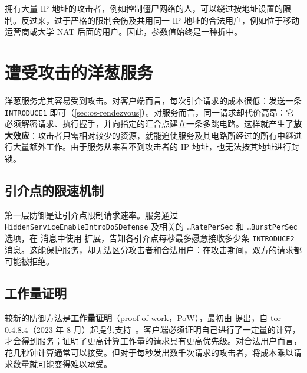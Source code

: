 \begin{attenzione}[按地址限制的局限]
拥有大量 IP 地址的攻击者，例如控制僵尸网络的人，可以绕过按地址设置的限制。反过来，过于严格的限制会伤及共用同一 IP 地址的合法用户，例如位于移动运营商或大学 NAT 后面的用户。因此，参数值始终是一种折中。
\end{attenzione}

\section{遭受攻击的洋葱服务}\label{sec:dos-onion}

洋葱服务尤其容易受到攻击。对客户端而言，每次引介请求的成本很低：发送一条 \texttt{INTRODUCE1} 即可（\cref{sec:os-rendezvous}）。对服务而言，同一请求却代价高昂：它必须解密请求、执行握手，并向指定的汇合点建立一条多跳电路。这样就产生了\textbf{放大效应}：攻击者只需相对较少的资源，就能迫使服务及其电路所经过的所有中继进行大量额外工作。由于服务从来看不到攻击者的 IP 地址，也无法按其地址进行封锁。

\subsection{引介点的限速机制}

第一层防御是让引介点限制请求速率。服务通过 \texttt{HiddenService\-EnableIntroDoS\-Defense} 及相关的 \texttt{\ldots RatePerSec} 和 \texttt{\ldots BurstPerSec} 选项，在  消息中使用  扩展，告知各引介点每秒最多愿意接收多少条 \texttt{INTRODUCE2} 消息。这能保护服务，却无法区分攻击者和合法用户：在攻击期间，双方的请求都可能被拒绝。

\subsection{工作量证明}

较新的防御方法是\textbf{工作量证明}（proof of work，PoW），最初由  提出，自 tor 0.4.8.4（2023 年 8 月）起提供支持~。客户端必须证明自己进行了一定量的计算，才会得到服务；证明了更高计算工作量的请求具有更高优先级。对合法用户而言，花几秒钟计算通常可以接受。但对于每秒发出数千次请求的攻击者，将成本乘以请求数量就可能变得难以承受。

